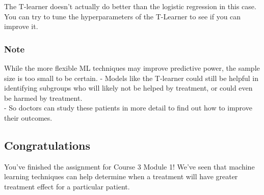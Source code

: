 \documentclass[11pt]{article}
\begin{document}
The T-learner doesn't actually do better than the logistic regression in
this case. You can try to tune the hyperparameters of the T-Learner to
see if you can improve it.

\hypertarget{note}{%
\subsubsection{Note}\label{note}}

While the more flexible ML techniques may improve predictive power, the
sample size is too small to be certain. - Models like the T-learner
could still be helpful in identifying subgroups who will likely not be
helped by treatment, or could even be harmed by treatment.\\
- So doctors can study these patients in more detail to find out how to
improve their outcomes.

    \hypertarget{congratulations}{%
\subsection{Congratulations}\label{congratulations}}

You've finished the assignment for Course 3 Module 1! We've seen that
machine learning techniques can help determine when a treatment will
have greater treatment effect for a particular patient.


    
    
    
    
\end{document}
